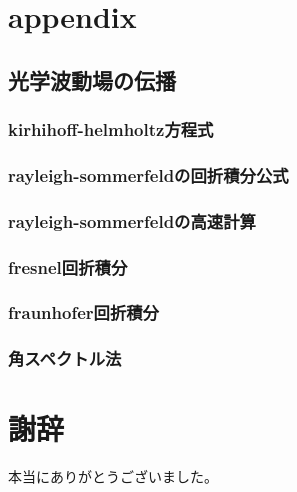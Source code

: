 \documentclass[dvipdfmx,autodetect-engine]{jreport}
\begin{document}
\newpage
\chapter{appendix}
\minitoc

\section{光学波動場の伝播}
\subsection{kirhihoff-helmholtz方程式}

\subsection{rayleigh-sommerfeldの回折積分公式}

\subsection{rayleigh-sommerfeldの高速計算}

\subsection{fresnel回折積分}

\subsection{fraunhofer回折積分}

\subsection{角スペクトル法}

\newpage



\chapter{謝辞}
本当にありがとうございました。
\end{document}
